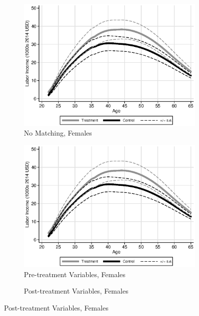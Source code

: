 \begin{figure}
\centering
\caption{Predicted Labor Income Profiles, Varying the Matching Variables}\label{fig:matchvariables}
\begin{subfigure}[h]{0.25\textwidth}
		\centering
		\caption{No Matching, Females}
		\includegraphics[width=\textwidth]{output/labor_20-65_pset1_mset1_female_sensitivity.eps}
\end{subfigure}%
\begin{subfigure}[h]{0.25\textwidth}
		\centering
		\caption{Pre-treatment Variables, Females}
		\includegraphics[width=\textwidth]{output/labor_20-65_pset1_mset1_female_sensitivity.eps}
\end{subfigure}%
\begin{subfigure}[h]{0.25\textwidth}
	\centering
	\caption{Post-treatment Variables, Females}

\end{subfigure}
\end{figure}
